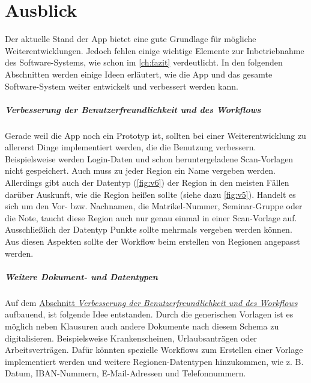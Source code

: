 \documentclass[notables, nomenclature, oneside, 150]{HSMW-Thesis}
\begin{document}
		
\chapter{Ausblick}\label{ch:ausblick}
	Der aktuelle Stand der App bietet eine gute Grundlage für mögliche Weiterentwicklungen. Jedoch fehlen einige wichtige Elemente zur Inbetriebnahme des Software-Systems, wie schon im \autoref{ch:fazit} verdeutlicht. In den folgenden Abschnitten werden einige Ideen erläutert, wie die App und das gesamte Software-System weiter entwickelt und verbessert werden kann.

	\paragraph*{Verbesserung der Benutzerfreundlichkeit und des Workflows} \label{pa:benutzer} 
		Gerade weil die App noch ein Prototyp ist, sollten bei einer Weiterentwicklung zu allererst Dinge implementiert werden, die die Benutzung verbessern. Beispielsweise werden Login-Daten und schon heruntergeladene Scan-Vorlagen nicht gespeichert. Auch muss zu jeder Region ein Name vergeben werden. Allerdings gibt auch der Datentyp (\ref{fig:v6}) der Region in den meisten Fällen darüber Auskunft, wie die Region heißen sollte (siehe dazu \autoref{fig:v5}). Handelt es sich um den Vor- bzw. Nachnamen, die Matrikel-Nummer, Seminar-Gruppe oder die Note, taucht diese Region auch nur genau einmal in einer Scan-Vorlage auf. Ausschließlich der Datentyp Punkte sollte mehrmals vergeben werden können. Aus diesen Aspekten sollte der Workflow beim erstellen von Regionen angepasst werden. 
	
	\paragraph*{Weitere Dokument- und Datentypen} 
		Auf dem \hyperref[pa:benutzer]{Abschnitt \textit{Verbesserung der Benutzerfreundlichkeit und des Workflows}} \xspace aufbauend, ist folgende Idee entstanden. Durch die generischen Vorlagen ist es möglich neben Klausuren auch andere Dokumente nach diesem Schema zu digitalisieren. Beispielsweise Krankenscheinen, Urlaubsanträgen oder Arbeitsverträgen. Dafür könnten spezielle Workflows zum Erstellen einer Vorlage implementiert werden und weitere Regionen-Datentypen hinzukommen, wie z. B. Datum, IBAN-Nummern, E-Mail-Adressen und Telefonnummern.
		
\end{document}

